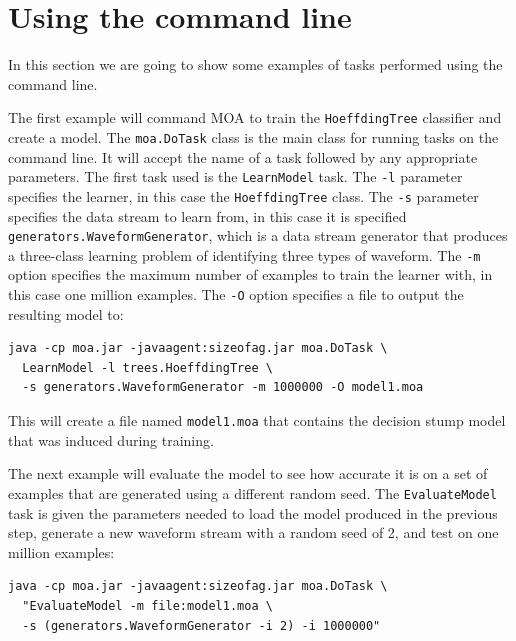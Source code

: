 \documentclass[a4paper,12pt,twoside]{book}
\begin{document}
\section{Using the command line}

In this section we are going to show some examples of tasks performed using the command line.

The first example will command MOA to train the \verb+HoeffdingTree+ classifier and create a model. The \verb+moa.DoTask+ class is the main class for running tasks on the command line. It will accept the name of a task followed by any appropriate parameters. The first task used is the \verb+LearnModel+ task. The \verb+-l+ parameter specifies the learner, in this case the \verb+HoeffdingTree+ class. The \verb+-s+ parameter specifies the data stream to learn from, in this case it is
specified  \verb+generators.WaveformGenerator+, which is a data stream generator that produces a three-class learning problem of identifying three types of waveform. The \verb+-m+ option specifies the maximum number of examples to train the learner with, in this case one million examples. The \verb+-O+ option specifies a file to output the resulting model to:

\begin{footnotesize}\begin{verbatim}
java -cp moa.jar -javaagent:sizeofag.jar moa.DoTask \
  LearnModel -l trees.HoeffdingTree \
  -s generators.WaveformGenerator -m 1000000 -O model1.moa
\end{verbatim}\end{footnotesize}

This will create a file named \verb+model1.moa+ that contains the decision stump model that was induced during training.

The next example will evaluate the model to see how accurate it is on a set of examples that are generated using a different random seed. The \verb+EvaluateModel+ task is given the parameters needed to load the model produced in the previous step, generate a new waveform stream with a random seed of 2, and test on one million examples:

\begin{footnotesize}\begin{verbatim}
java -cp moa.jar -javaagent:sizeofag.jar moa.DoTask \
  "EvaluateModel -m file:model1.moa \
  -s (generators.WaveformGenerator -i 2) -i 1000000"
\end{verbatim}\end{footnotesize}
\end{document}
